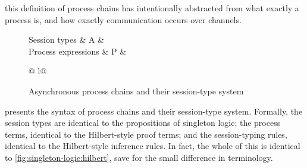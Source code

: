  this definition of process chains has intentionally abstracted from what exactly a process is, and how exactly communication occurs over channels.


\begin{figure}[tbp]
  \vspace*{\dimexpr-\abovedisplayskip-\abovecaptionskip\relax}
  \begin{syntax*}
    Session types &
      A & \alpha \mid {} \mid {}
    \\
    Process expressions &
      P &  \mid \fwd
        \begin{array}[t]{@{{} \mid {}}l@{}}
          \selectR{\kay} \mid {} \\
           \mid \selectL{\kay}
        \end{array}
  \end{syntax*}

  \vspace*{-\belowdisplayskip}
  \caption{Asynchronous process chains and their session-type system}\label{fig:singleton-processes:typing-rules}
\end{figure}
%
 presents the syntax of process chains and their session-type system.
Formally, the session types are identical to the propositions of singleton logic; the process terms, identical to the Hilbert-style proof terms; and the session-typing rules, identical to the Hilbert-style inference rules.
In fact, the whole of this  is identical to \cref{fig:singleton-logic:hilbert}, save for the small difference in terminology.

